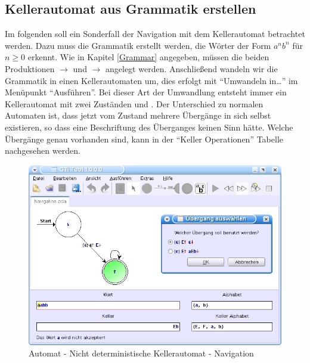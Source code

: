 \subsection{Kellerautomat aus Grammatik erstellen}

Im folgenden soll ein Sonderfall der Navigation mit dem Kellerautomat betrachtet
werden. Dazu muss die Grammatik erstellt werden, die Wörter der Form $a^n b^n$
für $n \geq 0$ erkennt. Wie in Kapitel \ref{Grammar} angegeben, müssen die beiden
Produktionen  $\to$ \TerminalSymbol{$\epsilon$} und
 $\to$ 
angelegt werden. Anschließend wandeln wir die Grammatik in einen
Kellerautomaten um, dies erfolgt mit "`Umwandeln in\ldots"' im Menüpunkt
"`Ausführen"'. Bei dieser Art der Umwandlung entsteht immer ein Kellerautomat
mit zwei Zuständen  und . Der Unterschied zu normalen
Automaten ist, dass jetzt vom Zustand  mehrere Übergänge in sich
selbst existieren, so dass eine Beschriftung des Überganges keinen Sinn hätte.
Welche Übergänge genau vorhanden sind, kann in der "`Keller Operationen"'
Tabelle nachgesehen werden.\vspace{10pt}

\begin{figure}[h]
\begin{center}
\includegraphics[width=12cm]{../images/grammar_pda.png}
\caption{Automat - Nicht deterministische Kellerautomat - Navigation}
\end{center}
\end{figure}

